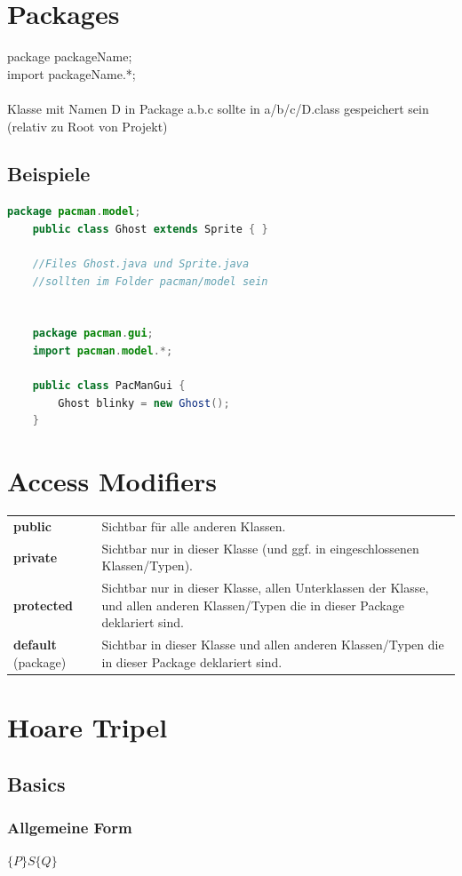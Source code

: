 \documentclass[12pt,a4paper]{article}
\begin{document}
\section{Packages}
package packageName;\\
import packageName.*;\\\\
Klasse mit Namen D in Package a.b.c sollte in a/b/c/D.class gespeichert sein (relativ zu Root von Projekt)
\subsection{Beispiele}
\begin{lstlisting}[language=Java]
	package pacman.model;
	public class Ghost extends Sprite { }

	//Files Ghost.java und Sprite.java
	//sollten im Folder pacman/model sein


	package pacman.gui;
	import pacman.model.*;

	public class PacManGui {
		Ghost blinky = new Ghost();
	}
\end{lstlisting}
\newpage
\section{Access Modifiers}
\begin{tabularx}{\linewidth}{ l X }
\textbf{public} & Sichtbar für alle anderen Klassen.\\
\textbf{private} & Sichtbar nur in dieser Klasse (und ggf. in eingeschlossenen Klassen/Typen).\\
\textbf{protected} & Sichtbar nur in dieser Klasse, allen Unterklassen der Klasse, und allen anderen Klassen/Typen die in dieser Package deklariert sind.\\
\textbf{default} (package) & Sichtbar in dieser Klasse und allen anderen Klassen/Typen die in dieser Package deklariert sind.
\end{tabularx}
\section{Hoare Tripel}
\subsection{Basics} %
\subsubsection{Allgemeine Form}
$\{P\} S \{Q\}$
\end{document}
